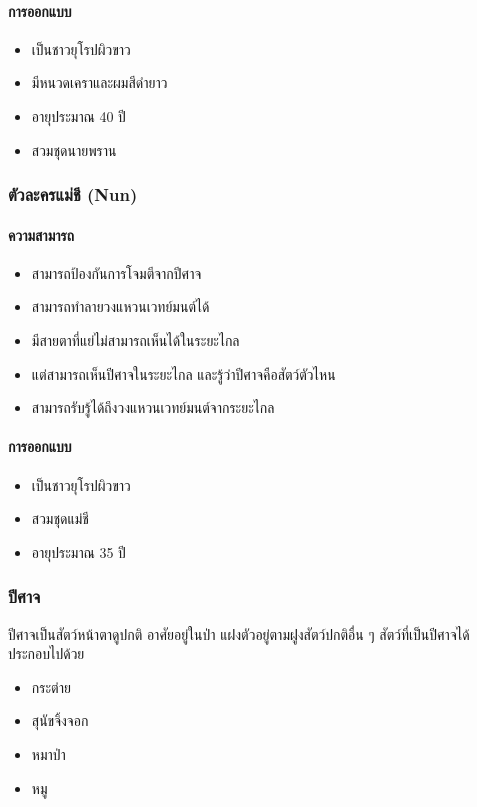 \paragraph{การออกแบบ}
\begin{itemize}
  \item เป็นชาวยุโรปผิวขาว
  \item มีหนวดเคราและผมสีดำยาว
  \item อายุประมาณ 40 ปี
  \item สวมชุดนายพราน
\end{itemize}

\subsubsection{ตัวละครแม่ชี (Nun)}

\paragraph{ความสามารถ}
\begin{itemize}
  \item สามารถป้องกันการโจมตีจากปีศาจ
  \item สามารถทำลายวงแหวนเวทย์มนต์ได้
  \item มีสายตาที่แย่ไม่สามารถเห็นได้ในระยะไกล
  \item แต่สามารถเห็นปีศาจในระยะไกล และรู้ว่าปีศาจคือสัตว์ตัวไหน
  \item สามารถรับรู้ได้ถึงวงแหวนเวทย์มนต์จากระยะไกล
\end{itemize}

\paragraph{การออกแบบ}
\begin{itemize}
  \item เป็นชาวยุโรปผิวขาว
  \item สวมชุดแม่ชี
  \item อายุประมาณ 35 ปี
\end{itemize}

\subsubsection{ปีศาจ}

ปีศาจเป็นสัตว์หน้าตาดูปกติ อาศัยอยู่ในป่า แฝงตัวอยู่ตามฝูงสัตว์ปกติอื่น ๆ สัตว์ที่เป็นปีศาจได้ ประกอบไปด้วย
\begin{itemize}
  \item กระต่าย
  \item สุนัขจิ้งจอก
  \item หมาป่า
  \item หมู
\end{itemize}

